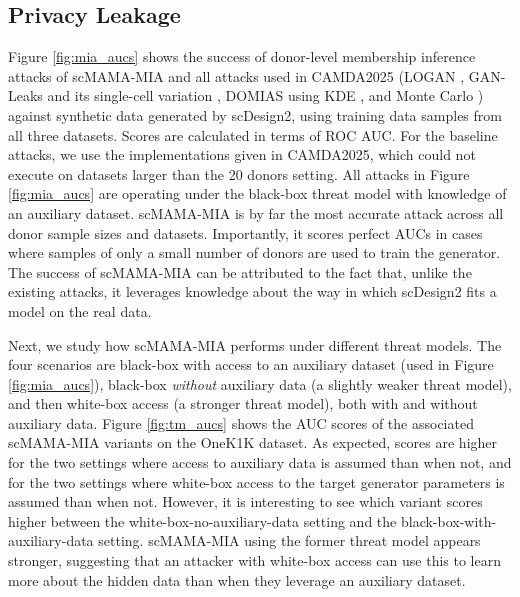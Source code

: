 \documentclass[unnumsec,webpdf,contemporary,large]{oup-authoring-template}%
\theoremstyle{thmstyleone}%
\theoremstyle{thmstyletwo}%
\theoremstyle{thmstylethree}%
\begin{document}
\subsection{Privacy Leakage}

Figure \ref{fig:mia_aucs} shows the success of donor-level membership inference attacks of scMAMA-MIA and all attacks used in CAMDA2025 (LOGAN \cite{hayes2017logan}, GAN-Leaks and its single-cell variation \cite{chen2020gan}, DOMIAS using KDE \cite{van2023membership}, and Monte Carlo \cite{hilprecht2019monte}) against synthetic data generated by scDesign2, using training data samples from all three datasets. Scores are calculated in terms of ROC AUC. 
For the baseline attacks, we use the implementations given in CAMDA2025, which could not execute on datasets larger than the 20 donors setting.
All attacks in Figure \ref{fig:mia_aucs} are operating under the black-box threat model with knowledge of an auxiliary dataset. 
scMAMA-MIA is by far the most accurate attack across all donor sample sizes and datasets. Importantly, it scores perfect AUCs in cases where samples of only a small number of donors are used to train the generator. The success of scMAMA-MIA can be attributed to the fact that, unlike the existing attacks, it leverages knowledge about the way in which scDesign2 fits a model on the real data. 

Next, we study how scMAMA-MIA performs under different threat models. The four scenarios are black-box with access to an auxiliary dataset (used in Figure \ref{fig:mia_aucs}), black-box \textit{without} auxiliary data (a slightly weaker threat model), and then white-box access (a stronger threat model), both with and without auxiliary data. Figure \ref{fig:tm_aucs} shows the AUC scores of the associated scMAMA-MIA variants on the OneK1K dataset. As expected, scores are higher for the two settings where access to auxiliary data is assumed than when not, and for the two settings where white-box access to the target generator parameters is assumed than when not. However, it is interesting to see which variant scores higher between the white-box-no-auxiliary-data setting and the black-box-with-auxiliary-data setting. scMAMA-MIA using the former threat model appears stronger, suggesting that an attacker with white-box access can use this to learn more about the hidden data than when they leverage an auxiliary dataset.
\end{document}
